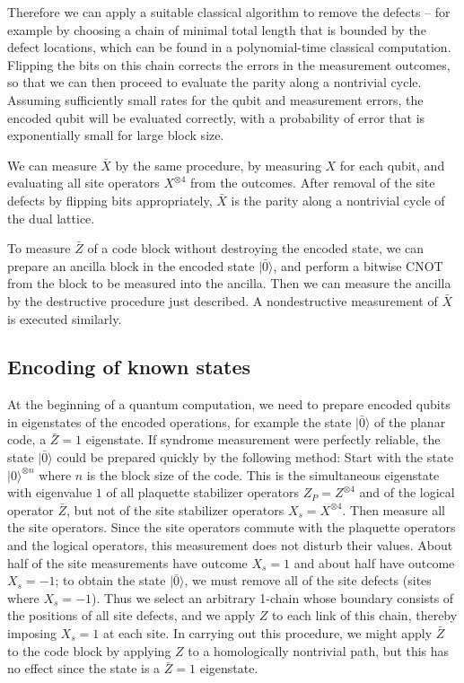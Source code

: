 Therefore we can apply a suitable classical algorithm to remove the defects --
for example by choosing a chain of minimal total length that is bounded by the
defect locations, which can be found in a polynomial-time classical
computation. Flipping the bits on this chain corrects the errors in the
measurement outcomes, so that we can then proceed to evaluate the parity along
a nontrivial cycle.  Assuming sufficiently small rates for the qubit and
measurement errors, the encoded qubit will be evaluated correctly, with a
probability of error that is exponentially small for large block size.

We can measure $\bar X$ by the same procedure, by measuring $X$ for each qubit,
and evaluating all site operators $X^{\otimes 4}$ from the outcomes. After removal of the site defects by flipping bits appropriately, $\bar X$ is the parity along a nontrivial cycle of the dual lattice.

To measure $\bar Z$ of a code block without destroying the encoded state, we
can prepare an ancilla block in the encoded state $|\bar 0\rangle$, and perform
a bitwise CNOT from the block to be measured into the ancilla.  Then we can
measure the ancilla by the destructive procedure just described.  A
nondestructive measurement of $\bar X$ is executed similarly.

\subsection{Encoding of known states}
\label{subsec:encoding_known}
At the beginning of a quantum computation, we need to prepare encoded qubits in eigenstates of the encoded operations, for example the state $|\bar 0\rangle$ of the planar
code, a $\bar Z=1$ eigenstate. If syndrome measurement were perfectly reliable, the state $|\bar0\rangle$ could be prepared quickly by the following method:  Start with the state
$|0\rangle^{\otimes n}$ where $n$ is the block size of the code.  This is the
simultaneous eigenstate with eigenvalue $1$ of all plaquette stabilizer
operators $Z_P=Z^{\otimes 4}$ and of the logical operator $\bar Z$, but not of the
site stabilizer operators $X_s=X^{\otimes 4}$.  Then measure all the site operators. Since the site operators commute with the plaquette operators and the logical operators, this measurement does not disturb their values. About half of the site measurements have outcome $X_s=1$ and about half have outcome $X_s=-1$; to obtain the state $|\bar 0\rangle$, we must remove all of the site defects (sites where $X_s=-1$). Thus we select an arbitrary 1-chain whose boundary consists of the positions of all site defects, and we apply
$Z$ to each link of this chain, thereby imposing $X_s=1$ at each
site. In carrying out this procedure, we might apply $\bar Z$ to the
code block by applying $Z$ to a homologically nontrivial path, but this has no
effect since the state is a $\bar Z=1$ eigenstate.


